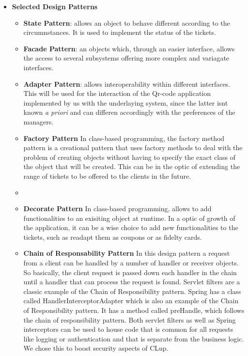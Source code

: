 \begin{itemize}
    \item \textbf{Selected Design Patterns}
          \begin{itemize}
            
            \item \textbf{State Pattern}: allows an object to behave different according to the circumnstances. It is used to implement the status of the tickets.
            \item \textbf{Facade Pattern}: an objects which, through an easier interface, allows the access to several subsystems offering more complex and variagate interfaces.
            \item \textbf{Adapter Pattern}: allows interoperability within different interfaces. This will be used for the interaction of the Qr-code application implemented by us with the underlaying system, since the latter isnt known \textit{a priori} and can differen accordingly with the preferences of the managers.
            \item \textbf{Factory Pattern} In class-based programming, the factory method pattern is a creational pattern that uses factory methods to deal with the problem of creating objects without having to specify the exact class of the object that will be created. This can be in the optic of extending the range of tickets to be offered to the clients in the future.
            \item \item \textbf{Decorate Pattern} In class-based programming, allows to add functionalities to an exisiting object at runtime.
            In a optic of growth of the application, it can be a wise choice to add new functionalities to the tickets, such as readapt them as coupons or as fidelty cards.
            \item \textbf{Chain of Responsability Pattern}  In this design pattern a request from a client can be handled by a number of handler or receiver objects. So basically, the client request is passed down each handler in the chain until a handler that can process the request is found. Servlet filters are a classic example of the Chain of Responsibility pattern. Spring has a class called HandlerInterceptorAdapter which is also an example of the Chain of Responsibility pattern. It has a method called preHandle, which follows the chain of responsibility pattern. Both servlet filters as well as Spring interceptors can be used to house code that is common for all requests like logging or authentication and that is separate from the business logic. We chose this to boost security aspects of CLup.

\end{itemize}
\end{itemize}
